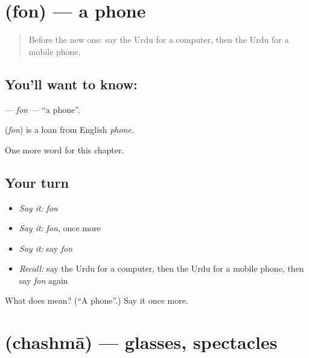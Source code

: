 \section[\texorpdfstring{\ur{فون} (fon)}{فون (fon)}]{ (fon) — a phone}

\label{lesson:UR-C110-fon}



\begin{quote}
Before the new one: say the Urdu for a computer, then the Urdu for a mobile phone.
\end{quote}

\subsection*{You'll want to know: }
\textbf{} — \emph{fon} — \textquotedblleft{}a phone\textquotedblright{}.

\begin{cousinweb}
\textbf{} (\emph{fon}) is a loan from English \emph{phone}.
\end{cousinweb}

\begin{grammarlens}[title={What you've built}]
One more word for this chapter.
\end{grammarlens}

\subsection*{Your turn}
\begin{itemize}
\raggedright
  \item \emph{Say it:} \emph{fon}
  \item \emph{Say it:} \emph{fon}, once more
  \item \emph{Say it:} say \emph{fon}
  \item \emph{Recall:} say the Urdu for a computer, then the Urdu for a mobile phone, then say \emph{fon} again
\end{itemize}

\begin{tcolorbox}[breakable,colback=teal!4,colframe=teal!35!black,title={Before you move on}]
What does  mean? (\textquotedblleft{}A phone\textquotedblright{}.) Say it once more.
\end{tcolorbox}
\section[\texorpdfstring{\ur{چشمہ} (chashmā)}{چشمہ (chashmā)}]{ (chashmā) — glasses, spectacles}

